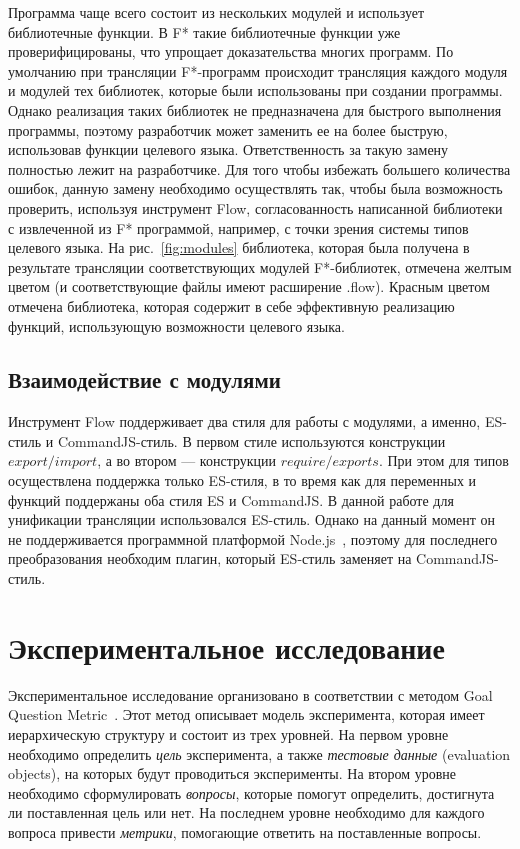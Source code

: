 Программа чаще всего состоит из нескольких модулей и использует библиотечные функции. В F* такие библиотечные функции уже проверифицированы, что упрощает доказательства многих программ. По умолчанию при трансляции F*-программ происходит трансляция каждого модуля и модулей тех библиотек, которые были использованы при создании программы. Однако реализация таких библиотек не предназначена для быстрого выполнения программы, поэтому разработчик может заменить ее на более быструю, использовав функции целевого языка. Ответственность за такую замену полностью лежит на разработчике. Для того чтобы избежать большего количества ошибок, данную замену необходимо осуществлять так, чтобы была возможность проверить, используя инструмент Flow, согласованность написанной библиотеки с извлеченной из F* программой, например, с точки зрения системы типов целевого языка. На рис.~\ref{fig:modules} библиотека, которая была получена в результате трансляции соответствующих модулей F*-библиотек, отмечена желтым цветом (и соответствующие файлы имеют расширение .flow). Красным цветом отмечена библиотека, которая содержит в себе эффективную реализацию функций, использующую возможности целевого языка. 

\subsection{Взаимодействие с модулями}

Инструмент Flow поддерживает два стиля для работы с модулями, а именно, ES-стиль и CommandJS-стиль. В первом стиле используются конструкции  $export/import$, а во втором --- конструкции $require/exports$. При этом для типов осуществлена поддержка только ES-стиля, в то время как для переменных и функций поддержаны оба стиля ES и CommandJS. В данной работе для унификации трансляции использовался ES-стиль. Однако на данный момент он не поддерживается программной платформой Node.js~\cite{node_js}, поэтому для последнего преобразования необходим плагин, который ES-стиль заменяет на CommandJS-стиль.

\section{Экспериментальное исследование}

Экспериментальное исследование организовано в соответствии с методом Goal Question Metric~\cite{van2002goal}. Этот метод описывает модель эксперимента, которая имеет иерархическую структуру и состоит из трех уровней. На первом уровне необходимо определить \textit{цель} эксперимента, а также \textit{тестовые данные} (evaluation objects), на которых будут проводиться эксперименты. На втором уровне необходимо сформулировать \textit{вопросы}, которые помогут определить, достигнута ли поставленная цель или нет. На последнем уровне необходимо для каждого вопроса привести \textit{метрики}, помогающие ответить на поставленные вопросы. 

